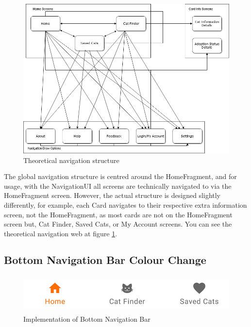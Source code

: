 \begin{figure} [htbp!]
    \centering
    \includegraphics[width=\textwidth]{Images/Navigation Web.png}
    \caption{Theoretical navigation structure}
    \label{fig:global_structure}
\end{figure}

The global navigation structure is centred around the HomeFragment, and for usage, with the NavigationUI all screens are technically navigated to via the HomeFragment screen. However, the actual structure is designed slightly differently, for example, each \gls{Card} navigates to their respective extra information screen, not the HomeFragment, as most cards are not on the HomeFragment screen but, Cat Finder, Saved Cats, or My Account screens. You can see the theoretical navigation web at figure \ref{fig:global_structure}.

\subsection{Bottom Navigation Bar Colour Change}

\begin{figure} [htbp!]
    \centering
    \includegraphics[height=2cm]{Images/BottomNavigationBar.png}
    \caption{Implementation of Bottom Navigation Bar}
    \label{fig:bottom_navigation_bar}
\end{figure}

